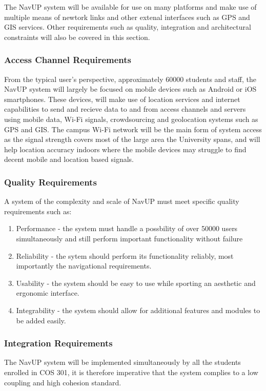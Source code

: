 \documentclass[11pt,a4paper]{report}
\begin{document}
		The NavUP system will be available for use on many platforms and make use of multiple means of newtork links and other extenal interfaces such as GPS and GIS services.
		Other requirements such as quality, integration and architectural constraints will also be covered in this section.
		
			\subsubsection{Access Channel Requirements}
				From the typical user's perspective, approximately 60000 students and staff, the NavUP system will largely be focused on mobile devices such as Android or iOS smartphones.
				These devices, will make use of location services and internet capabilities to send and recieve data to and from access channels and servers using mobile data,
				Wi-Fi signals, crowdsourcing and geolocation systems such as GPS and GIS. The campus Wi-Fi network will be the main form of system access as the signal
				strength covers most of the large area the University spans, and will help location accuracy indoors where the mobile devices may struggle to find decent mobile
				and location based signals.
				
			\subsubsection{Quality Requirements}
				A system of the complexity and scale of NavUP must meet specific quality requirements such as:
				
				\begin{enumerate}
				\renewcommand{\labelenumi}{{\textbf{\arabic{enumi}.}}}
				\item Performance - the system must handle a possbility of over 50000 users simultaneously and still perform important functionality without failure
				\item Reliability - the sytem should perform its functionality reliably, most importantly the navigational requirements.
				\item Usability - the system should be easy to use while sporting an aesthetic and ergonomic interface.
				\item Integrability - the system should allow for additional features and modules to be added easily.
				\end{enumerate}
				
			\subsubsection{Integration Requirements}
				The NavUP system will be implemented simultaneously by all the students enrolled in COS 301, it is therefore imperative that the system complies to a low coupling and high cohesion standard.
\end{document}
